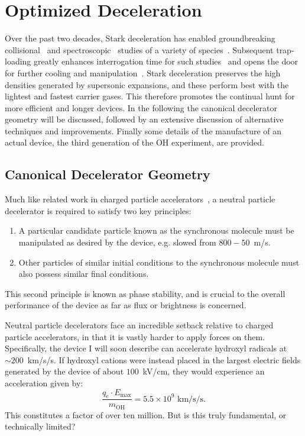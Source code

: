 \ifx\justbeingincluded\undefined


\fi

\chapter{Optimized Deceleration}
\label{chapter:slowing}

Over the past two decades, Stark deceleration has enabled groundbreaking collisional~\cite{Sawyer2011,Kirste2012,Gao2018} and spectroscopic~\cite{Veldhoven2004,Hudson2006,Lev2006,Fast2018} studies of a variety of species~\cite{VanDeMeerakker2012}. 
Subsequent trap-loading greatly enhances interrogation time for such studies~\cite{Sawyer2008} and opens the door for further cooling and manipulation~\cite{Stuhl2012evap, Reens2017}. 
Stark deceleration preserves the high densities generated by supersonic expansions, and these perform best with the lightest and fastest carrier gases.
This therefore promotes the continual hunt for more efficient and longer devices.
In the following the canonical decelerator geometry will be discussed, followed by an extensive discussion of alternative techniques and improvements.
Finally some details of the manufacture of an actual device, the third generation of the OH experiment, are provided.


\section{Canonical Decelerator Geometry}

Much like related work in charged particle accelerators~\cite{McMillan1945}, a neutral particle decelerator is required to satisfy two key principles:
\begin{enumerate}
\item A particular candidate particle known as the synchronous molecule must be manipulated as desired by the device, e.g. slowed from $800-50$~m/s.
\item Other particles of similar initial conditions to the synchronous molecule must also possess similar final conditions.
\end{enumerate}
This second principle is known as phase stability, and is crucial to the overall performance of the device as far as flux or brightness is concerned.

Neutral particle decelerators face an incredible setback relative to charged particle accelerators, in that it is vastly harder to apply forces on them.
Specifically, the device I will soon describe can accelerate hydroxyl radicals at $\sim 200$~km/s/s. 
If hydroxyl cations were instead placed in the largest electric fields generated by the device of about $100$~kV/cm, they would experience an acceleration given by:
\begin{equation}
\frac{q_e\cdot E_\text{max} }{m_\text{OH}} = 5.5\times 10^9\text{ km/s/s}.
\end{equation}
This constitutes a factor of over ten million. 
But is this truly fundamental, or technically limited? 

